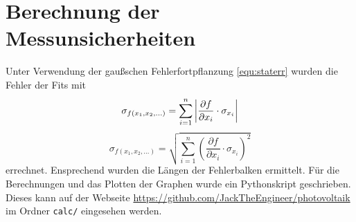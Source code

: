 \section{Berechnung der Messunsicherheiten}
Unter Verwendung der
gaußschen Fehlerfortpflanzung \ref{equ:staterr} wurden die
Fehler der Fits mit
\begin{equation}
	\sigma_{f(x_1,x_2,...)} = \sum\limits_{i=1}^n \left\vert\frac{\partial f}{\partial x_i}\cdot \sigma_{x_i}\right\vert
	\label{equ:syserr}
\end{equation}
\begin{equation}
	\sigma_{f(x_1,x_2,...)} = \sqrt{\sum\limits_{i=1}^n (\frac{\partial f}{\partial x_i} \cdot \sigma_{x_i})^2}
	\label{equ:staterr}
\end{equation}
errechnet.
Ensprechend wurden die Längen der Fehlerbalken ermittelt.
Für die Berechnungen und das Plotten der Graphen wurde ein Pythonskript geschrieben.
Dieses kann auf der Webseite \url{https://github.com/JackTheEngineer/photovoltaik}
im Ordner \texttt{calc/} eingesehen werden.

